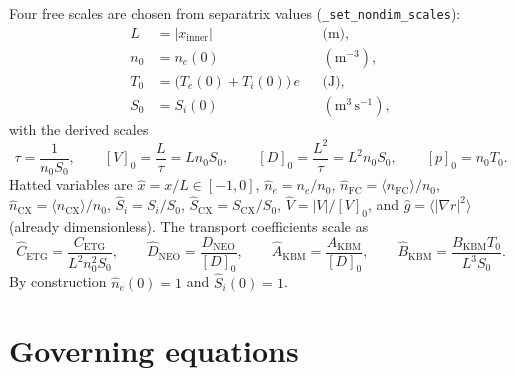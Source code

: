 \documentclass[11pt]{article}
\newcommand{\hn}{\hat{n}}
\newcommand{\hx}{\hat{x}}
\newcommand{\hg}{\hat{g}}
\newcommand{\hS}{\hat{S}}
\newcommand{\hV}{\hat{V}}
\newcommand{\hD}{\hat{D}}
\newcommand{\code}[1]{\texttt{#1}}
\begin{document}
Four free scales are chosen from separatrix values
(\code{\_set\_nondim\_scales}):
\begin{align}
  L    &= |x_{\mathrm{inner}}|                &&\text{(m)},   \\
  n_0  &= n_e(0)                              &&(\mathrm{m^{-3}}), \\
  T_0  &= \bigl(T_e(0) + T_i(0)\bigr)\,e      &&\text{(J)},   \\
  S_0  &= S_i(0)                              &&(\mathrm{m^3\,s^{-1}}),
\end{align}
with the derived scales
\begin{equation}
  \tau = \frac{1}{n_0 S_0}, \qquad
  [V]_0 = \frac{L}{\tau} = L n_0 S_0, \qquad
  [D]_0 = \frac{L^2}{\tau} = L^2 n_0 S_0, \qquad
  [p]_0 = n_0 T_0 .
\end{equation}
Hatted variables are $\hx = x/L \in [-1,0]$, $\hn_e = n_e/n_0$,
$\hn_{\mathrm{FC}} = \langle n_{\mathrm{FC}}\rangle/n_0$,
$\hn_{\mathrm{CX}} = \langle n_{\mathrm{CX}}\rangle/n_0$,
$\hS_i = S_i/S_0$, $\hS_{\mathrm{CX}} = S_{\mathrm{CX}}/S_0$,
$\hV = |V|/[V]_0$, and $\hg = \langle |\nabla r|^2 \rangle$ (already
dimensionless).  The transport coefficients scale as
\begin{equation}
  \hat{C}_{\mathrm{ETG}} = \frac{C_{\mathrm{ETG}}}{L^2 n_0^2 S_0},\qquad
  \hD_{\mathrm{NEO}}     = \frac{D_{\mathrm{NEO}}}{[D]_0},\qquad
  \hat{A}_{\mathrm{KBM}} = \frac{A_{\mathrm{KBM}}}{[D]_0},\qquad
  \hat{B}_{\mathrm{KBM}} = \frac{B_{\mathrm{KBM}} T_0}{L^3 S_0}.
\end{equation}
By construction $\hn_e(0) = 1$ and $\hS_i(0) = 1$.

\section{Governing equations}
\end{document}
